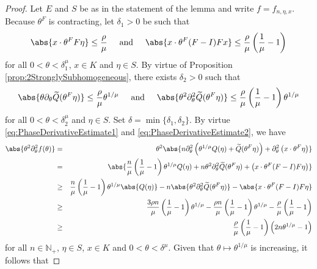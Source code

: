 \documentclass[11pt, letter]{book}
\begin{document}
\begin{proof}
Let $E$ and $S$ be as in the statement of the lemma and write $f=f_{n,\eta,x}$. Because ${\theta^F}$ is contracting, let $\delta_1>0$ be such that
\begin{equation}\label{eq:PhaseDerivativeEstimate1}
    \abs{x\cdot \theta^F F \eta}\leq \frac{\rho}{\mu}\hspace{.5cm}\mbox{and}\hspace{.5cm}\abs{x\cdot \theta^F (F-I)Fx}\leq \frac{\rho}{\mu}\left(\frac{1}{\mu}-1\right)
\end{equation}
for all $0<\theta<\delta_1^\mu$, $x\in K$ and $\eta\in S$. By virtue of Proposition \ref{prop:2StronglySubhomogeneous}, there exists $\delta_2>0$ such that
\begin{equation}\label{eq:PhaseDerivativeEstimate2}
    \abs{\theta\partial_\theta \widetilde{Q}(\theta^F\eta)}\leq\frac{\rho}{\mu}\theta^{1/\mu}
\hspace{0.5cm}\mbox{and}\hspace{0.5cm}
    \abs{\theta^2\partial_{\theta}^2\widetilde{Q}(\theta^F\eta)}\leq\frac{\rho}{\mu}\left(\frac{1}{\mu}-1\right)\theta^{1/\mu}
\end{equation}
for all $0<\theta<\delta_2^{\mu}$ and $\eta\in S$. Set $\delta=\min\{\delta_1,\delta_2\}$. By virtue \eqref{eq:PhaseDerivativeEstimate1} and \eqref{eq:PhaseDerivativeEstimate2}, we have
\begin{eqnarray*}
    \abs{\theta^2\partial_{\theta}^2 f(\theta)}&=&\theta^2\abs{n\partial_\theta^2\left( \theta^{1/\mu}Q(\eta)+\widetilde{Q}(\theta^F\eta)\right)+\partial_\theta^2\left(x\cdot \theta^F\eta\right)}\\
    &=&\abs{\frac{n}{\mu}\left(\frac{1}{\mu}-1\right)\theta^{1/\mu}Q(\eta)+n\theta^2\partial_\theta^2\widetilde{Q}(\theta^F\eta)+\left(x\cdot \theta^F(F-I)F\eta\right)}\\
    &\geq& \frac{n}{\mu}\left(\frac{1}{\mu}-1\right)\theta^{1/\mu}\abs{Q(\eta)}-n\abs{\theta^2\partial_\theta^2\widetilde{Q}(\theta^F\eta)}-\abs{x\cdot\theta^F(F-I)F\eta}\\
    &\geq&\frac{3\rho n}{\mu}\left(\frac{1}{\mu}-1\right)\theta^{1/\mu}-\frac{\rho n}{\mu}\left(\frac{1}{\mu}-1\right)\theta^{1/\mu}-\frac{\rho}{\mu}\left(\frac{1}{\mu}-1\right)\\
    &\geq &\frac{\rho}{\mu}\left(\frac{1}{\mu}-1\right)\left(2n\theta^{1/\mu}-1\right)
\end{eqnarray*}
for all $n\in\mathbb{N}_+$, $\eta\in S$, $x\in K$ and $0<\theta<\delta^\mu$. Given that $\theta\mapsto \theta^{1/\mu}$ is increasing, it follows that

\end{proof}
\end{document}
